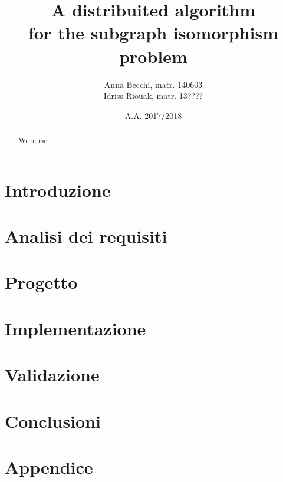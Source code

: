\documentclass{checkpoint/llncs}
\title{A distribuited algorithm\\for the subgraph isomorphism problem}
\author{Anna Becchi, matr. 140603\\
  Idriss Riouak, matr. 13????}
\institute{Laurea Magistrale in Informatica\\Universit\`a di Udine}
\date{A.A. 2017/2018}
\begin{document}
\maketitle
\begin{abstract}
Write me.
\end{abstract}

\section{Introduzione}
\label{ch:intro}


\section{Analisi dei requisiti}
\label{ch:analysis}



\section{Progetto}
\label{ch:project}


\section{Implementazione}
\label{ch:impl}


\section{Validazione}
\label{ch:validation}


\section{Conclusioni}
\label{ch:conclusions}


\appendix

\section{Appendice}
\label{ch:appendix}

\end{document}
